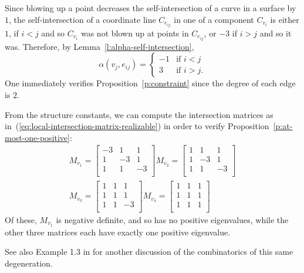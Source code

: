 \documentclass[11pt,reqno]{amsart}
\theoremstyle{definition}
\begin{document}
\begin{ex}
Since blowing up a point decreases the self-intersection of a curve in a surface
by $1$, the self-intersection of a coordinate line $C_{e_{ij}}$ in one of a component
$C_{v_i}$ is
either $1$, if $i < j$ and so $C_{v_i}$ was not blown up at points in
$C_{e_{ij}}$, or $-3$ if $i > j$ and so it was.
Therefore, by Lemma~\ref{l:alpha-self-intersection}, 
\begin{equation*}
\alpha(v_j, e_{ij}) =
\begin{cases}
-1 & \mbox{if } i < j \\
3 & \mbox{if } i > j.
\end{cases}
\end{equation*}
One immediately verifies Proposition~\ref{p:constraint} since the degree of each
edge is $2$.

From the structure constants, we can compute the intersection matrices as
in~(\ref{eq:local-intersection-matrix-realizable}) in order to verify
Proposition~\ref{p:at-most-one-positive}:
\begin{gather*}
M_{v_1} = \begin{bmatrix}
-3 & 1 & 1 \\
1 & -3 & 1 \\
1 & 1 & -3 \\
\end{bmatrix}
M_{v_2} = \begin{bmatrix}
1 & 1 & 1 \\
1 & -3 & 1 \\
1 & 1 & -3 \\
\end{bmatrix} \\
M_{v_3} = \begin{bmatrix}
1 & 1 & 1 \\
1 & 1 & 1 \\
1 & 1 & -3 \\
\end{bmatrix}
M_{v_4} = \begin{bmatrix}
1 & 1 & 1 \\
1 & 1 & 1 \\
1 & 1 & 1 \\
\end{bmatrix}
\end{gather*}
Of these, $M_{v_1}$ is negative definite, and so has no positive eigenvalues,
while the other three matrices each have exactly one positive eigenvalue.

See also Example 1.3 in \cite{yu-balancing} for another discussion of the
combinatorics of this same degeneration.
\end{ex}
\end{document}
